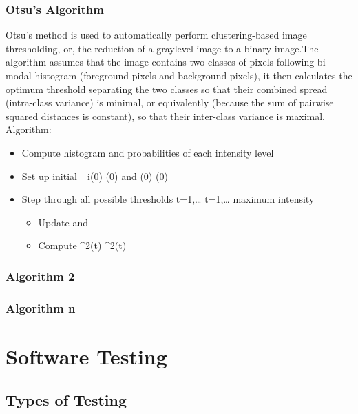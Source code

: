\documentclass[oneside,a4paper,12pt]{report}
\begin{document}
\subsection{Otsu's Algorithm}
Otsu's method is used to automatically perform clustering-based image thresholding, or, the reduction of a graylevel image to a binary image.The algorithm assumes that the image contains two classes of pixels following bi-modal histogram (foreground pixels and background pixels), it then calculates the optimum threshold separating the two classes so that their combined spread (intra-class variance) is minimal, or equivalently (because the sum of pairwise squared distances is constant), so that their inter-class variance is maximal.\\
Algorithm:\\
\begin{itemize}
    \item Compute histogram and probabilities of each intensity level
    \item Set up initial {\displaystyle \textomega _{i}(0)} \textomega {}(0) and {\displaystyle \textmu {}(0)} \textmu {}(0)
    \item Step through all possible thresholds {\displaystyle t=1,\ldots } {\displaystyle t=1,\ldots } maximum intensity
    \begin{itemize}
        \item Update {\displaystyle \textomega {}} \textomega {} and {\displaystyle \textmu {}} \textmu {}
        \item Compute {\displaystyle \textsigma {}^{2}(t)} \textsigma {}^{2}(t)
    \end{itemize}
\end{itemize}
\subsection{Algorithm 2}
\subsection{Algorithm n}


\chapter{Software Testing }
\section{Types of Testing}
\end{document}
